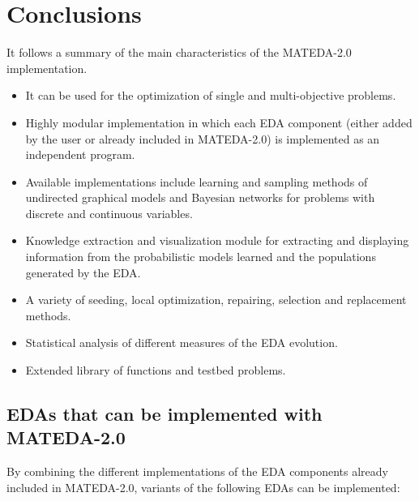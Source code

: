 \documentclass[a4paper]{article}
\begin{document}
\section{Conclusions}


   It follows a summary of the main characteristics of the
   MATEDA-2.0 implementation.

\begin{itemize}
  \item It can be used for the optimization of single and multi-objective problems.
  \item Highly modular implementation in which each EDA component (either added by the user
  or already included in MATEDA-2.0) is implemented as an independent program.
  \item Available implementations include learning and sampling methods of undirected
  graphical models and Bayesian networks for problems with discrete and continuous variables.
  \item Knowledge extraction and visualization module for extracting
  and displaying information from the probabilistic models learned
  and the populations generated by the EDA.
  \item A variety of seeding, local optimization, repairing, selection and
  replacement methods.
  \item Statistical analysis of different measures of the EDA evolution.
  \item Extended library of functions and testbed problems.
\end{itemize}


\subsection{EDAs that can be implemented with MATEDA-2.0}

By combining the different implementations of the EDA components already included in MATEDA-2.0, variants
 of the following EDAs can be implemented:
\end{document}
